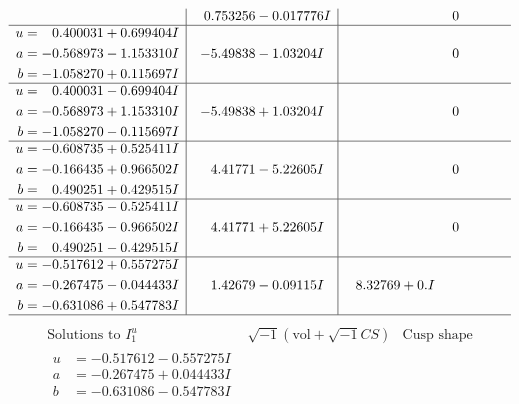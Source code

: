 \documentclass[1p]{elsarticle_modified}
\theoremstyle{definition}
\newcommand{\I}{\sqrt{-1}}
\begin{document}
$$\begin{array}{c|c|c}
 & \phantom{-}0.753256 - 0.017776 I & \phantom{-0.000000 } 0 \\ \hline\begin{aligned}
u &= \phantom{-}0.400031 + 0.699404 I \\
a &= -0.568973 - 1.153310 I \\
b &= -1.058270 + 0.115697 I\end{aligned}
 & -5.49838 - 1.03204 I & \phantom{-0.000000 } 0 \\ \hline\begin{aligned}
u &= \phantom{-}0.400031 - 0.699404 I \\
a &= -0.568973 + 1.153310 I \\
b &= -1.058270 - 0.115697 I\end{aligned}
 & -5.49838 + 1.03204 I & \phantom{-0.000000 } 0 \\ \hline\begin{aligned}
u &= -0.608735 + 0.525411 I \\
a &= -0.166435 + 0.966502 I \\
b &= \phantom{-}0.490251 + 0.429515 I\end{aligned}
 & \phantom{-}4.41771 - 5.22605 I & \phantom{-0.000000 } 0 \\ \hline\begin{aligned}
u &= -0.608735 - 0.525411 I \\
a &= -0.166435 - 0.966502 I \\
b &= \phantom{-}0.490251 - 0.429515 I\end{aligned}
 & \phantom{-}4.41771 + 5.22605 I & \phantom{-0.000000 } 0 \\ \hline\begin{aligned}
u &= -0.517612 + 0.557275 I \\
a &= -0.267475 - 0.044433 I \\
b &= -0.631086 + 0.547783 I\end{aligned}
 & \phantom{-}1.42679 - 0.09115 I & \phantom{-}8.32769 + 0. I\phantom{ +0.000000I}\\
 \hline 
 \end{array}$$\newpage$$\begin{array}{c|c|c}  
\text{Solutions to }I^u_{1}& \I (\text{vol} + \sqrt{-1}CS) & \text{Cusp shape}\\
 \hline 
\begin{aligned}
u &= -0.517612 - 0.557275 I \\
a &= -0.267475 + 0.044433 I \\
b &= -0.631086 - 0.547783 I\end{aligned}

\end{array}$$
\end{document}
